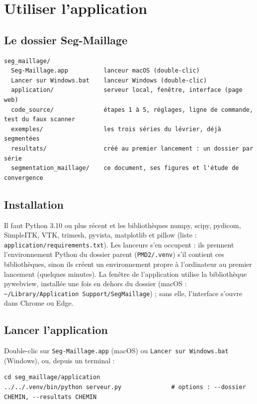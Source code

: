 \documentclass[11pt,a4paper]{article}
\newcommand{\fichier}[1]{\texttt{\small #1}}
\begin{document}
\section{Utiliser l'application}
\label{sec-utiliser}

\subsection{Le dossier Seg-Maillage}

\begin{Verbatim}
seg_maillage/
  Seg-Maillage.app          lanceur macOS (double-clic)
  Lancer sur Windows.bat    lanceur Windows (double-clic)
  application/              serveur local, fenêtre, interface (page web)
  code_source/              étapes 1 à 5, réglages, ligne de commande, test du faux scanner
  exemples/                 les trois séries du lévrier, déjà segmentées
  resultats/                créé au premier lancement : un dossier par série
  segmentation_maillage/    ce document, ses figures et l'étude de convergence
\end{Verbatim}

\subsection{Installation}

Il faut Python 3.10 ou plus récent et les bibliothèques numpy, scipy, pydicom, SimpleITK, VTK, trimesh, pyvista,
matplotlib et pillow (liste : \fichier{application/requirements.txt}). Les lanceurs s'en occupent : ils prennent
l'environnement Python du dossier parent (\fichier{PMD2/.venv}) s'il contient ces bibliothèques, sinon ils créent un
environnement propre à l'ordinateur au premier lancement (quelques minutes). La fenêtre de l'application utilise la
bibliothèque pywebview, installée une fois en dehors du dossier (macOS : \fichier{\textasciitilde/Library/Application
Support/SegMaillage}) ; sans elle, l'interface s'ouvre dans Chrome ou Edge.

\subsection{Lancer l'application}

Double-clic sur \fichier{Seg-Maillage.app} (macOS) ou \fichier{Lancer sur Windows.bat} (Windows), ou, depuis un
terminal :

\begin{Verbatim}
cd seg_maillage/application
../../.venv/bin/python serveur.py              # options : --dossier CHEMIN, --resultats CHEMIN
\end{Verbatim}
\end{document}
